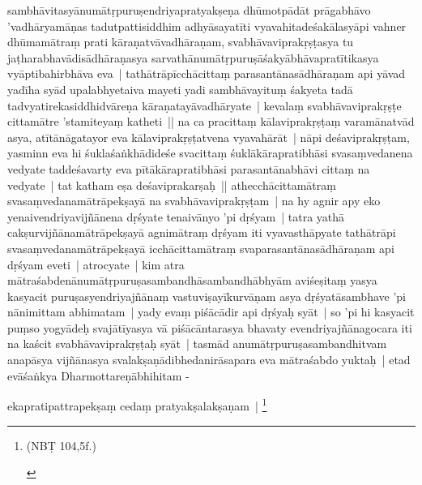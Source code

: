 \documentclass[article,a4paper]{memoir}
\begin{document}
sambhā\-vitasyā\-numā\-tṛpuruṣendriyapratyakṣeṇa dhū\-motpā\-dā\-t prā\-gabhā\-vo 'vadhā\-ryamā\-ṇas tadutpattisiddhim adhyā\-sayatī\-ti vyavahitadeśakā\-lasyā\-pi vahner dhū\-mamā\-traṃ prati kā\-raṇatvā\-vadhā\-raṇam, svabhā\-vaviprakṛṣṭasya tu jaṭharabhavā\-disā\-dhā\-raṇasya sarvathā\-numā\-tṛpuruṣā\-śakyā\-bhā\-vapratī\-tikasya vyā\-ptibahirbhā\-va eva | tathā\-trā\-pī\-cchā\-cittaṃ parasantā\-nasā\-dhā\-raṇam api yā\-vad yadī\-ha syā\-d upalabhyetaiva mayeti yadi sambhā\-vayituṃ śakyeta tadā\- tadvyatirekasiddhidvā\-reṇa kā\-raṇatayā\-vadhā\-ryate | kevalaṃ svabhā\-vaviprakṛṣṭe cittamā\-tre 'stamiteyaṃ katheti || \label{thakur75-146.7} na ca pracittaṃ kā\-laviprakṛṣṭaṃ varamā\-natvā\-d asya, atī\-tā\-nā\-gatayor eva kā\-laviprakṛṣṭatvena vyavahā\-rā\-t | \label{thakur75-146.9} nā\-pi deśaviprakṛṣṭam, yasminn eva hi śuklaśaṅkhā\-dideśe svacittaṃ śuklā\-kā\-rapratibhā\-si svasaṃvedanena vedyate taddeśavarty eva pī\-tā\-kā\-rapratibhā\-si parasantā\-nabhā\-vi cittaṃ na vedyate | tat katham eṣa deśaviprakarṣaḥ || \label{thakur75-146.12} athecchā\-cittamā\-traṃ svasaṃvedanamā\-trā\-pekṣayā\- na svabhā\-vaviprakṛṣṭam | na hy agnir apy eko yenaivendriyavijñā\-nena dṛśyate tenaivā\-nyo 'pi dṛśyam | tatra yathā\- cakṣurvijñā\-namā\-trā\-pekṣayā\- agnimā\-traṃ dṛśyam iti vyavasthā\-pyate tathā\-trā\-pi svasaṃvedanamā\-trā\-pekṣayā\- icchā\-cittamā\-traṃ svaparasantā\-nasā\-dhā\-raṇam api dṛśyam eveti | \label{thakur75-146.16} atrocyate | kim atra mā\-traśabdenā\-numā\-tṛpuruṣasambandhā\-sambandhā\-bhyā\-m aviśeṣitaṃ yasya kasyacit puruṣasyendriyajñā\-naṃ vastuviṣayī\-kurvā\-ṇam asya dṛśyatā\-sambhave 'pi nā\-nimittam abhimatam | yady evaṃ piśā\-cā\-dir api dṛśyaḥ syā\-t | so 'pi hi kasyacit puṃso yogyā\-deḥ svajā\-tī\-yasya vā\- piśā\-cā\-ntarasya bhavaty evendriyajñā\-nagocara iti na kaścit svabhā\-vaviprakṛṣṭaḥ syā\-t | tasmā\-d anumā\-tṛpuruṣasambandhitvam anapā\-sya vijñā\-nasya svalakṣaṇā\-dibhedanirā\-sapara eva mā\-traśabdo yuktaḥ | etad evā\-śaṅkya Dharmottareṇā\-bhihitam -
	\pend
      

	  \pstart ekapratipattrapekṣaṃ cedaṃ pratyakṣalakṣaṇam | \footnote{\begin{english}(NBṬ 104,5f.)\end{english}}
	\pend
      
\end{document}
